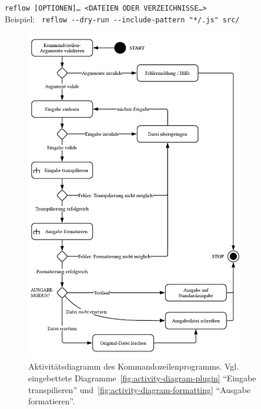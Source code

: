 {{
  \small
  \texttt{reflow [OPTIONEN]… <DATEIEN ODER VERZEICHNISSE…>}\\
  Beispiel: \texttt{ reflow -{}-dry-run -{}-include-pattern "{}*/.js"{} src/}
}



\begin{figure}[tbp]
  \centering
  \includegraphics[width=0.85\textwidth]{src/4_Umsetzung/fig/activity-diagram-cli.pdf}
  \caption[Aktivitätsdiagramm des Kommandozeilenprogramms]{Aktivitätsdiagramm des Kommandozeilenprogramms. Vgl. eingebettete Diagramme~\ref{fig:activity-diagram-plugin} \enquote{Eingabe transpilieren} und~\ref{fig:activity-diagram-formatting} \enquote{Ausgabe formatieren}.}
  \label{fig:activity-diagram-cli}
\end{figure}

}

